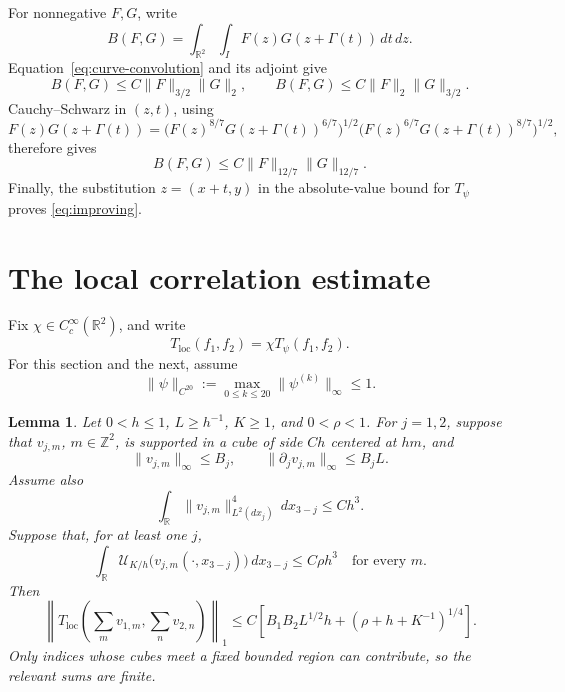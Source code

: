 \documentclass[11pt,a4paper]{article}
\newcommand{\R}{\mathbb R}
\newcommand{\Z}{\mathbb Z}
\newtheorem{lemma}{Lemma}[section]
\begin{document}
For nonnegative $F,G$, write
\[
B(F,G)=\int_{\R^2}\int_IF(z)G(z+\Gamma(t))\,dt\,dz.
\]
Equation~\eqref{eq:curve-convolution} and its adjoint give
\[
B(F,G)\leq C\|F\|_{3/2}\|G\|_2,\qquad
B(F,G)\leq C\|F\|_2\|G\|_{3/2}.
\]
Cauchy--Schwarz in $(z,t)$, using
\[
F(z)G(z+\Gamma(t))
=\bigl(F(z)^{8/7}G(z+\Gamma(t))^{6/7}\bigr)^{1/2}
 \bigl(F(z)^{6/7}G(z+\Gamma(t))^{8/7}\bigr)^{1/2},
\]
therefore gives
\[
B(F,G)\leq C\|F\|_{12/7}\|G\|_{12/7}.
\]
Finally, the substitution $z=(x+t,y)$ in the absolute-value bound for
$T_\psi$ proves \eqref{eq:improving}.

\section{The local correlation estimate}

Fix $\chi\in C_c^\infty(\R^2)$, and write
\[
T_{\mathrm{loc}}(f_1,f_2)=\chi T_\psi(f_1,f_2).
\]
For this section and the next, assume
\[
\|\psi\|_{C^{20}}:=\max_{0\leq k\leq20}\|\psi^{(k)}\|_\infty\leq1.
\tag{5.1}\label{eq:smooth-cutoff-normalization}
\]

\begin{lemma}\label{lem:local-correlation}
Let $0<h\leq1$, $L\geq h^{-1}$, $K\geq1$, and $0<\rho<1$. For $j=1,2$,
suppose that $v_{j,m}$, $m\in\Z^2$, is supported in a cube of side $Ch$
centered at $hm$, and
\[
\|v_{j,m}\|_\infty\leq B_j,\qquad
\|\partial_jv_{j,m}\|_\infty\leq B_jL.
\tag{5.2}\label{eq:local-derivatives}
\]
Assume also
\[
\int_{\R}\|v_{j,m}\|_{L^2(dx_j)}^4\,dx_{3-j}\leq Ch^3.
\tag{5.3}\label{eq:local-fiber-energy}
\]
Suppose that, for at least one $j$,
\[
\int_{\R}\mathcal U_{K/h}
\bigl(v_{j,m}(\cdot,x_{3-j})\bigr)\,dx_{3-j}
\leq C\rho h^3\quad\text{for every }m.
\tag{5.4}\label{eq:local-uniformity}
\]
Then
\[
\left\|T_{\mathrm{loc}}\left(\sum_m v_{1,m},\sum_n v_{2,n}\right)\right\|_1
\leq C\left[B_1B_2L^{1/2}h+(\rho+h+K^{-1})^{1/4}\right].
\tag{5.5}\label{eq:local-correlation-bound}
\]
Only indices whose cubes meet a fixed bounded region can contribute, so
the relevant sums are finite.
\end{lemma}
\end{document}

